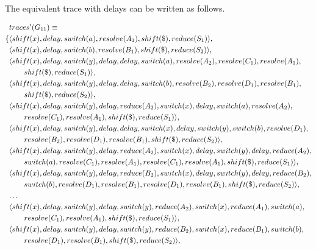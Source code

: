\documentclass[envcountsame,runningheads]{llncs}
\begin{document}
The equivalent trace with delays can be written as follows.

{\small\parbox{\textwidth}{\begin{align*}
&traces^{\prime}(G_{11}) \equiv \\
\{ & \langle shift(x), delay, switch(a), resolve(A_1), shift(\$), reduce(S_1) \rangle,\\
   & \langle shift(x), delay, switch(b), resolve(B_1), shift(\$), reduce(S_2) \rangle,\\
   & \langle shift(x), delay, switch(y), delay, delay, switch(a), resolve(A_2), resolve(C_1), resolve(A_1), \\ & \qquad shift(\$), reduce(S_1) \rangle,\\
   & \langle shift(x), delay, switch(y), delay, delay, switch(b), resolve(B_2), resolve(D_1), resolve(B_1), \\ & \qquad shift(\$), reduce(S_2) \rangle,\\
   & \langle shift(x), delay, switch(y), delay, reduce(A_2), switch(x), delay, switch(a), resolve(A_2), \\ & \qquad resolve(C_1), resolve(A_1), shift(\$), reduce(S_1) \rangle,\\
   & \langle shift(x), delay, switch(y), delay, delay, switch(x), delay, switch(y), switch(b), resolve(D_1), \\ & \qquad resolve(B_2), resolve(D_1), resolve(B_1), shift(\$), reduce(S_2) \rangle,\\
   & \langle shift(x), delay, switch(y), delay, reduce(A_2), switch(x), delay, switch(y), delay, reduce(A_2), \\ & \qquad switch(a), resolve(C_1), resolve(A_1), resolve(C_1), resolve(A_1), shift(\$), reduce(S_1) \rangle,\\
   & \langle shift(x), delay, switch(y), delay, reduce(B_2), switch(x), delay, switch(y), delay, reduce(B_2), \\ & \qquad switch(b), resolve(D_1), resolve(B_1), resolve(D_1), resolve(B_1), shift(\$), reduce(S_2) \rangle,\\
   & \textellipsis \\
   & \langle shift(x), delay, switch(y), delay, switch(y), reduce(A_2), switch(x), reduce(A_1), switch(a), \\ & \qquad resolve(C_1), resolve(A_1), shift(\$), reduce(S_1) \rangle,\\
   & \langle shift(x), delay, switch(y), delay, switch(y), reduce(B_2), switch(x), reduce(B_1), switch(b), \\ & \qquad resolve(D_1), resolve(B_1), shift(\$), reduce(S_2) \rangle,\\

\end{align*}}}
\end{document}
